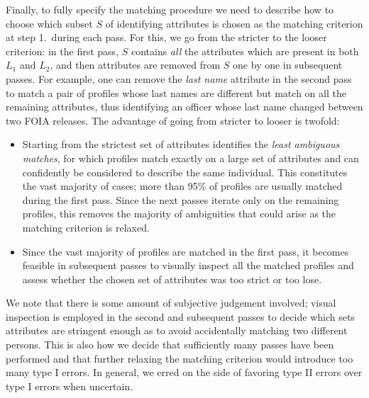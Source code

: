 Finally, to fully specify the matching procedure we need to describe how to
choose which subset $S$ of identifying attributes is chosen as the matching
criterion at step 1.\ during each pass. For this, we go from the stricter to
the looser criterion: in the first pass, $S$ contains \emph{all} the attributes
which are present in both $L_1$ and $L_2$, and then attributes are removed from
$S$ one by one in subsequent passes. For example, one can remove the \emph{last
name} attribute in the second pass to match a pair of profiles whose last names
are different but match on all the remaining attributes, thus identifying an
officer whose last name changed between two FOIA releases. The advantage of
going from stricter to looser is twofold:
\begin{itemize}
	\item Starting from the strictest set of attributes identifies the
		\emph{least ambiguous matches}, for which profiles match exactly on
		a large set of attributes and can confidently be considered to describe
		the same individual. This constitutes the vast majority of cases;
		more than 95\% of profiles are usually matched during the first pass.
		Since the next passes iterate only on the remaining profiles, this
		removes the majority of ambiguities that could arise as the
		matching criterion is relaxed.
	\item Since the vast majority of profiles are matched in the first pass,
		it becomes feasible in subsequent passes to visually inspect all
		the matched profiles and assess whether the chosen set of attributes was
		too strict or too lose.
\end{itemize}

We note that there is some amount of subjective judgement involved;
 visual inspection is employed in the second and subsequent passes to decide which sets
attributes are stringent enough as to avoid accidentally matching two different persons. 
This is also how we decide that sufficiently many passes have been
performed and that further relaxing the matching criterion would introduce too
many type I errors. In general, we erred on the side of favoring
type II errors over type I errors when uncertain.


